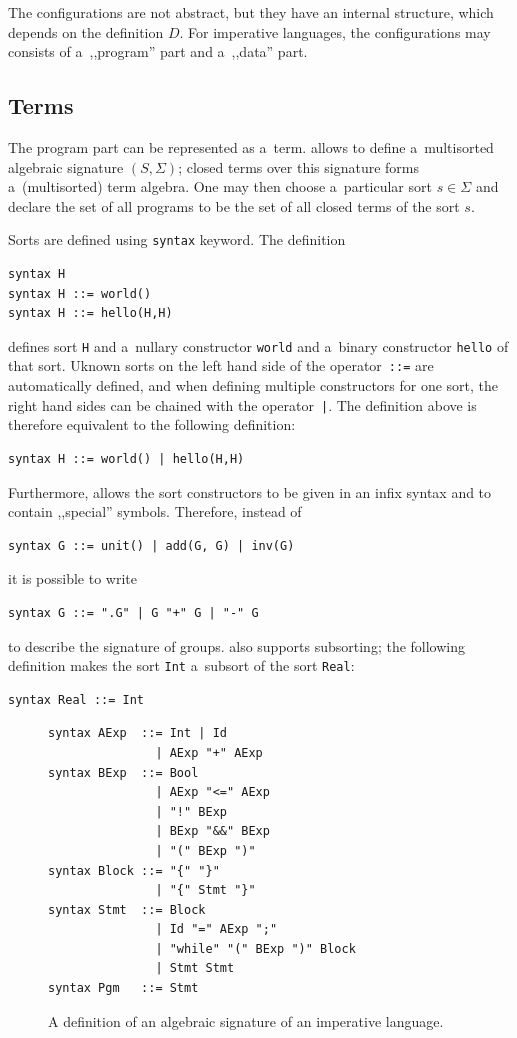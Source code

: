 \documentclass{fithesis3}
\newcommand{\var}[1]{\mathit{#1}\xspace}
\begin{document}

The configurations are not abstract, but they have an internal structure, which depends on the definition $\var{D}$. 
For imperative languages, the configurations may consists of a~,,program'' part and a~,,data'' part.

\subsection{Terms}

The program part can be represented as a~term. \K allows to define a~multisorted algebraic signature $(S, \Sigma)$; closed terms over this signature forms a~(multisorted) term algebra. One may then choose a~particular sort $s \in \Sigma$ and declare the set of all programs to be the set of all closed terms of the sort $s$.

Sorts are defined using \texttt{syntax} keyword. The definition
\begin{lstlisting}
syntax H
syntax H ::= world()
syntax H ::= hello(H,H)
\end{lstlisting}
defines sort \texttt{H} and a~nullary constructor \texttt{world} and a~binary constructor \texttt{hello} of that sort. Uknown sorts on the left hand side of the operator~\texttt{::=} are automatically defined, and when defining multiple constructors for one sort, the right hand sides can be chained with the operator~\texttt{|}. The definition above is therefore equivalent to the following definition:
\begin{lstlisting}
syntax H ::= world() | hello(H,H)
\end{lstlisting}
Furthermore, \K allows the sort constructors to be given in an infix syntax and to contain ,,special'' symbols. Therefore, instead of
\begin{lstlisting}
syntax G ::= unit() | add(G, G) | inv(G)
\end{lstlisting}
it is possible to write
\begin{lstlisting}
syntax G ::= ".G" | G "+" G | "-" G
\end{lstlisting}
to describe the signature of groups. \K also supports subsorting; the following definition makes the sort \texttt{Int} a~subsort of the sort \texttt{Real}:
\begin{lstlisting}
syntax Real ::= Int
\end{lstlisting}

\begin{figure}[h]
\begin{lstlisting}
syntax AExp  ::= Int | Id
               | AExp "+" AExp
syntax BExp  ::= Bool
               | AExp "<=" AExp
               | "!" BExp
               | BExp "&&" BExp
               | "(" BExp ")"
syntax Block ::= "{" "}"
               | "{" Stmt "}"
syntax Stmt  ::= Block
               | Id "=" AExp ";"
               | "while" "(" BExp ")" Block
               | Stmt Stmt
syntax Pgm   ::= Stmt
\end{lstlisting}
\caption{A definition of an algebraic signature of an imperative language.}
\label{impSyntax}
\end{figure}
\end{document}
